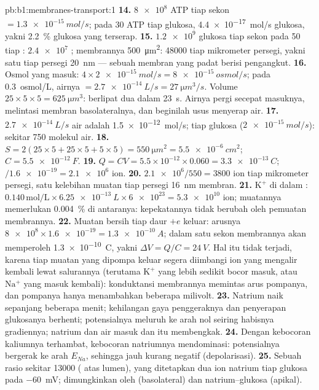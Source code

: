 \begin{solution}{pb:b1:membranes-transport:1}
\textbf{14.} $\num{8e8}$ ATP tiap sekon $= \qty{1.3e-15}{mol/s}$; pada
30 ATP tiap glukosa, \qty{4.4e-17}{mol/s} glukosa, yakni \qty{2.2}{\%}
glukosa yang terserap.
\textbf{15.} $\num{1.2e9}$ glukosa tiap sekon pada 50 tiap :
$\num{2.4e7}$ ; membrannya \qty{500}{\micro m^2}: \num{48000}
tiap mikrometer persegi, yakni satu tiap persegi \qty{20}{nm} --- sebuah
membran yang padat berisi pengangkut.
\textbf{16.} Osmol yang masuk: $4\times\qty{2e-15}{mol/s} =
\qty{8e-15}{osmol/s}$; pada \qty{0.3}{osmol/L}, airnya
$= \qty{2.7e-14}{L/s} = \qty{27}{\micro m^3/s}$. Volume 
$25\times 5\times 5 = \qty{625}{\micro m^3}$: berlipat dua dalam
\qty{23}{s}. Airnya pergi secepat masuknya, melintasi membran
basolateralnya, dan beginilah usus menyerap air.
\textbf{17.} $\qty{2.7e-14}{L/s}$ air adalah \qty{1.5e-12}{mol/s}; tiap glukosa ($\qty{2e-15}{mol/s}$): sekitar 750 molekul air.
\textbf{18.} $S = 2(25\times 5 + 25\times 5 + 5\times 5) =
\qty{550}{\micro m^2} = \qty{5.5e-6}{cm^2}$; $C = \qty{5.5e-12}{F}$.
\textbf{19.} $Q = CV = 5.5\times 10^{-12}\times 0.060 =
\qty{3.3e-13}{C}$; $/\num{1.6e-19} = \num{2.1e6}$ ion.
\textbf{20.} $\num{2.1e6}/550 = 3800$ ion tiap mikrometer persegi, satu kelebihan muatan tiap persegi \qty{16}{nm} membran.
\textbf{21.} $\mathrm{K^+}$ di dalam : $0.140\,\mathrm{mol/L}\times
\qty{6.25e-13}{L}\times\num{6e23} = \num{5.3e10}$ ion; muatannya
memerlukan \qty{0.004}{\%} di antaranya: kepekatannya tidak berubah oleh
pemuatan membrannya.
\textbf{22.} Muatan bersih tiap daur $+e$ keluar: arusnya $\num{8e8}\times
\num{1.6e-19} = \qty{1.3e-10}{A}$; dalam satu sekon membrannya akan
memperoleh \qty{1.3e-10}{C}, yakni $\Delta V = Q/C = \qty{24}{V}$. Hal
itu tidak terjadi, karena tiap muatan yang dipompa keluar segera
diimbangi ion yang mengalir kembali lewat salurannya (terutama
$\mathrm{K^+}$ yang lebih sedikit bocor masuk, atau $\mathrm{Na^+}$ yang
masuk kembali): konduktansi membrannya memintas arus pompanya, dan
pompanya hanya menambahkan beberapa milivolt.
\textbf{23.} Natrium  naik sepanjang beberapa menit;
 kehilangan gaya penggeraknya dan penyerapan glukosanya
berhenti; potensialnya meluruh ke arah nol seiring habisnya gradiennya;
natrium dan air masuk dan  itu membengkak.
\textbf{24.} Dengan kebocoran kaliumnya terhambat, kebocoran natriumnya
mendominasi: potensialnya bergerak ke arah $E_{Na}$, sehingga jauh
kurang negatif (depolarisasi).
\textbf{25.} Sebuah rasio sekitar \num{13000} ( atas lumen), yang
ditetapkan dua ion natrium tiap glukosa pada \qty{-60}{mV}; dimungkinkan
oleh  (basolateral) dan  natrium--glukosa
(apikal).
\end{solution}
